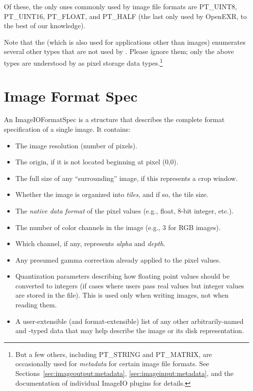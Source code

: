 Of these, the only ones commonly used by image file formats
are {\cf PT_UINT8}, {\cf PT_UINT16}, {\cf PT_FLOAT}, and {\cf PT_HALF}
(the last only used by OpenEXR, to the best of our knowledge).

Note that the \ParamBaseType (which is also used for applications other
than images) enumerates several other types that are not used by
\product.  Please ignore them; only the above types are understood by
\product as pixel storage data types.\footnote{But a few others, including
{\cf PT_STRING} and {\cf PT_MATRIX}, are occasionally used for
\emph{metadata} for certain image file formats. See
Sections~\ref{sec:imageoutput:metadata}, \ref{sec:imageinput:metadata},
and the documentation of individual ImageIO plugins for details.}

\section{Image Format Spec}

An {\kw ImageIOFormatSpec} is a structure that describes the complete
format specification of a single image.  It contains:

\begin{itemize}
\item The image resolution (number of pixels).
\item The origin, if it is not located beginning at pixel (0,0).
\item The full size of any ``surrounding'' image, if this represents a crop
  window.
\item Whether the image is organized into \emph{tiles}, and if so, the
  tile size.
\item The \emph{native data format} of the pixel values (e.g., float, 8-bit
  integer, etc.).
\item The number of color channels in the image (e.g., 3 for RGB
  images).
\item Which channel, if any, represents \emph{alpha} and \emph{depth}.
\item Any presumed gamma correction already applied to the pixel values.
\item Quantization parameters describing how floating point values
  should be converted to integers (if cases where users pass real values
  but integer values are stored in the file).  This is used only when
  writing images, not when reading them.
\item A user-extensible (and format-extensible) list of any other
  arbitrarily-named and -typed data that may help describe the image or
  its disk representation.
\end{itemize}

